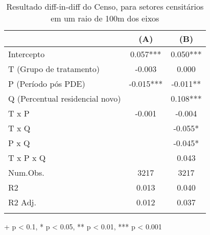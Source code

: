 \begin{table}[!t]
\caption{Resultado diff-in-diff do Censo, para setores censitários em um raio de 100m dos eixos} 
\centering
\fontsize{12.0pt}{14.4pt}\selectfont
\begin{tabular*}{.7\linewidth}{@{\extracolsep{\fill}}lcc}
  & (A) & (B) \\ 
\midrule\addlinespace[2.5pt]
Intercepto & 0.057*** & 0.050*** \\ 
T (Grupo de tratamento) & -0.003 & 0.000 \\ 
P (Período pós PDE) & -0.015*** & -0.011** \\ 
Q (Percentual residencial novo) &  & 0.108*** \\ 
T x P & -0.001 & -0.004 \\ 
T x Q &  & -0.055* \\ 
P x Q &  & -0.045* \\ 
{T x P x Q} & {} & {0.043} \\ 
\midrule
Num.Obs. & 3217 & 3217 \\ 
R2 & 0.013 & 0.040 \\ 
R2 Adj. & 0.012 & 0.037 \\ 
\bottomrule
\label{tab:did-censo}
\end{tabular*}
\begin{minipage}{.7\linewidth}
+ p < 0.1, * p < 0.05, ** p < 0.01, *** p < 0.001\\
\end{minipage}
\end{table}

